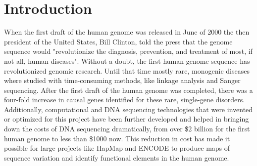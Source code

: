 \chapterfont{\color{Grey}}  %
\sectionfont{\color{Grey}}  %
\subsectionfont{\color{Grey}}  %

\renewcommand\pcolor{Grey}
\renewcommand{\headrule}{\hbox to\headwidth{%
		\color{Grey}\leaders\hrule height \headrulewidth\hfill}} %
\fancyfoot[LE,RO]{\thepage}

{ \Large {} }


\chapter{Introduction}
\label{chap:introduction}


\newpage

\noindent

When the first draft of the human genome was released in June of 2000 the then president of the United States, Bill Clinton, told the press that the genome sequence would "revolutionize the diagnosis, prevention, and treatment of most, if not all, human diseases"\cite{collinsHasRevolutionArrived2010a}. Without a doubt, the first human genome sequence has revolutionized genomic research. Until that time mostly rare, monogenic diseases where studied with time-consuming methods, like linkage analysis and Sanger sequencing. After the first draft of the human genome was completed, there was a four-fold increase in causal genes identified for these rare, single-gene disorders\cite{claussnitzerBriefHistoryHuman2020b}. Additionally, computational and DNA sequencing technologies that were invented or optimized for this project\cite{hoodHumanGenomeProject2013} have been further developed and helped in bringing down the costs of DNA sequencing dramatically, from over \$2 billion for the first human genome to less than \$1000 now. This reduction in cost has made it possible for large projects like HapMap\cite{theinternationalhapmapconsortiumInternationalHapMapProject2003} and ENCODE\cite{consortiumENCODEENCyclopediaDNA2004} to produce maps of sequence variation and identify functional elements in the human genome. 

